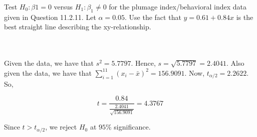 Test $H_0:\beta1=0$ versus $H_1:\beta_1\neq0$ for the plumage index/behavioral index data given in
Question 11.2.11. Let $\alpha=0.05$. Use the fact that $y=0.61+0.84x$ is the best straight line
describing the xy-relationship.\\\\

\begin{solution}\renewcommand{\qedsymbol}{}\ \\
    Given the data, we have that $s^2=5.7797$. Hence, $s=\sqrt{5.7797}=2.4041$. Also given the data, we
    have that $\sum_{i=1}^{11}(x_i-\bar{x})^2=156.9091$. Now, $t_{\alpha/2}=2.2622$. So,
    
    $$t=\frac{0.84}{\frac{2.4041}{\sqrt{156.9091}}}=4.3767$$
    
    Since $t>t_{\alpha/2}$, we reject $H_0$ at $95\%$ significance.

\end{solution}